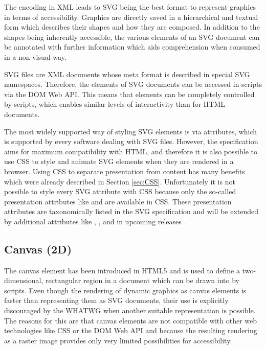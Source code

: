 The encoding in XML leads to SVG being the best format to represent graphics in terms of accessibility.
Graphics are directly saved in a hierarchical and textual form which describes their shapes and how they are composed. 
In addition to the shapes being inherently accessible, the various elements of an SVG document can be annotated with further information which aids comprehension when consumed in a non-visual way.

SVG files are XML documents whose meta format is described in special SVG namespaces. 
Therefore, the elements of SVG documents can be accessed in scripts via the DOM Web API. 
This means that elements can be completely controlled by scripts, which enables similar levels of interactivity than for HTML documents.

The most widely supported way of styling SVG elements is via attributes, which is supported by every software dealing with SVG files. 
However, the specification aims for maximum compatibility with HTML, and therefore it is also possible to use CSS to style and animate SVG elements when they are rendered in a browser. 
Using CSS to separate presentation from content has many benefits which were already described in Section \ref{sec:CSS}.
Unfortunately it is not possible to style every SVG attribute with CSS because only the so-called presentation attributes like  and  are available in CSS. 
These presentation attributes are taxonomically listed in the SVG specification \parencite{SVG11} and will be extended by additional attributes like , ,  and  in upcoming releases \parencite{SVG2}.

\subsection{Canvas (2D)}
\label{sec:Canvas2D}

The canvas element has been introduced in HTML5 \parencite{HTML} and is used to define a two-dimensional, rectangular region in a document which can be drawn into by scripts.
Even though the rendering of dynamic graphics as canvas elements is faster than representing them as SVG documents, their use is explicitly discouraged by the WHATWG when another suitable representation is possible.
The reasons for this are that canvas elements are not compatible with other web technologies like CSS or the DOM Web API and because the resulting rendering as a raster image provides only very limited possibilities for accessibility.


